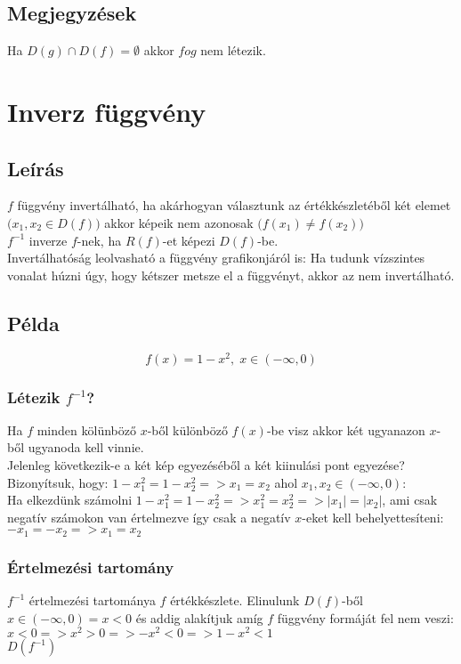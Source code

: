 \documentclass{article}
\theoremstyle{mytheoremstyle}
\theoremstyle{mytheoremstyle}
\theoremstyle{myproblemstyle}
\begin{document}
\subsection{Megjegyzések}
Ha $D(g) \cap D(f) = \emptyset$ akkor $fog$ nem létezik.
\section{Inverz függvény}
\subsection{Leírás}
$f$ függvény invertálható, ha akárhogyan választunk az értékkészletéből
két elemet $\bigl(x_1,x_2\in D(f)\bigr)$ akkor képeik nem azonosak
$\bigl(f(x_1)\neq f(x_2)\bigr)$\\
$f^{-1}$ inverze $f$-nek, ha $R(f)$-et képezi $D(f)$-be.\\
Invertálhatóság leolvasható a függvény grafikonjáról is:
Ha tudunk vízszintes vonalat húzni úgy, hogy kétszer metsze el a függvényt,
akkor az nem invertálható.\\
\subsection{Példa}
$$f(x)=1-x^2,\;x\in (-\infty ,0)$$
\subsubsection{Létezik $f^{-1}$?}
Ha $f$ minden kölünböző $x$-ből különböző $f(x)$-be visz akkor két ugyanazon
$x$-ből ugyanoda kell vinnie.\\
Jelenleg következik-e a két kép egyezéséből a két kiinulási pont egyezése?\\
Bizonyítsuk, hogy: $1-x_1^2=1-x_2^2=>x_1=x_2$ ahol $x_1,x_2\in (-\infty,0)$:\\
Ha elkezdünk számolni $1-x_1^2=1-x_2^2=>x_1^2=x_2^2=>|x_1|=|x_2|$, ami csak negatív számokon
van értelmezve így csak a negatív $x$-eket kell behelyettesíteni:
$-x_1=-x_2=>x_1=x_2$\\
\subsubsection{Értelmezési tartomány}
$f^{-1}$ értelmezési tartománya $f$ értékkészlete. Elinulunk $D(f)$-ből
$x\in (-\infty ,0)=x<0$
és addig alakítjuk amíg $f$ függvény formáját fel nem veszi:\\
$x<0=>x^2>0=>-x^2<0=>1-x^2<1$\\
$D(f^{-1})$
\end{document}
